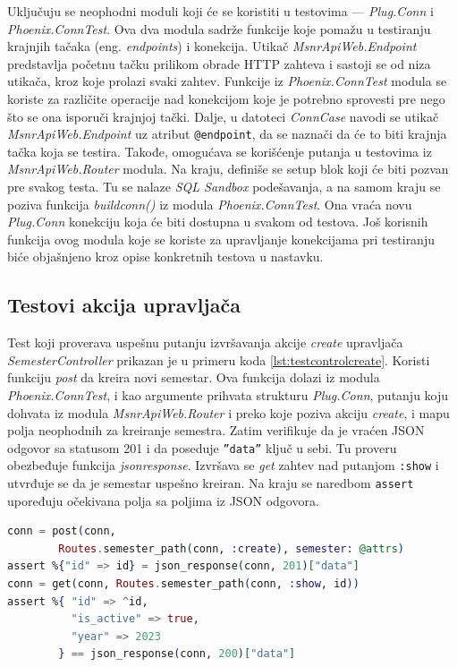 \documentclass[12pt,oneside]{memoir}
\begin{document}
\par Uključuju se neophodni moduli koji će se koristiti u testovima --- \emph{Plug.Conn} i \emph{Phoenix.ConnTest}. Ova dva modula sadrže funkcije koje pomažu u testiranju krajnjih tačaka (eng. \emph{endpoints}) i konekcija. Utikač \emph{MsnrApiWeb.Endpoint} predstavlja početnu tačku prilikom obrade HTTP zahteva i sastoji se od niza utikača, kroz koje prolazi svaki zahtev. Funkcije iz \emph{Phoenix.ConnTest} modula se koriste za različite operacije nad konekcijom koje je potrebno sprovesti pre nego što se ona isporuči krajnjoj tački. Dalje, u datoteci \emph{ConnCase} navodi se utikač \emph{MsnrApiWeb.Endpoint} uz atribut \texttt{@endpoint}, da se naznači da će to biti krajnja tačka koja se testira. Takođe, omogućava se korišćenje putanja u testovima iz \emph{MsnrApiWeb.Router} modula. Na kraju, definiše se setup blok koji će biti pozvan pre svakog testa. Tu se nalaze \emph{SQL Sandbox} podešavanja, a na samom kraju se poziva funkcija \emph{build{\textunderscore}conn()} iz modula \emph{Phoenix.ConnTest}. Ona vraća novu \emph{Plug.Conn} konekciju koja će biti dostupna u svakom od testova. Još korisnih funkcija ovog modula koje se koriste za upravljanje konekcijama pri testiranju biće objašnjeno kroz opise konkretnih testova u nastavku.

\subsection{Testovi akcija upravljača}

\par Test koji proverava uspešnu putanju izvršavanja akcije \emph{create} upravljača \emph{SemesterController} prikazan je u primeru koda \ref{lst:testcontrolcreate}. Koristi funkciju \emph{post} da kreira novi semestar. Ova funkcija dolazi iz modula \emph{Phoenix.ConnTest}, i kao argumente prihvata strukturu \emph{Plug.Conn}, putanju koju dohvata iz modula \emph{MsnrApiWeb.Router} i preko koje poziva akciju \emph{create}, i mapu polja neophodnih za kreiranje semestra. Zatim verifikuje da je vraćen JSON odgovor sa statusom 201 i da poseduje \texttt{''data''} ključ u sebi. Tu proveru obezbeđuje funkcija \emph{json{\textunderscore}response}. Izvršava se \emph{get} zahtev nad putanjom \texttt{:show} i utvrđuje se da je semestar uspešno kreiran. Na kraju se naredbom \texttt{assert} upoređuju očekivana polja sa poljima iz JSON odgovora. \\

\begin{minipage}{\linewidth}
\begin{lstlisting}[language=elixir, basicstyle=\small, caption={Testiranje akcije \emph{create} upravljača \emph{SemesterController}},captionpos=b, label={lst:testcontrolcreate}]
conn = post(conn,
  		Routes.semester_path(conn, :create), semester: @attrs)
assert %{"id" => id} = json_response(conn, 201)["data"]
conn = get(conn, Routes.semester_path(conn, :show, id))
assert %{ "id" => ^id,
          "is_active" => true,
          "year" => 2023 
        } == json_response(conn, 200)["data"]
\end{lstlisting}
\end{minipage}
\end{document}
